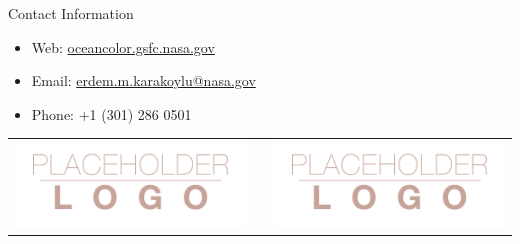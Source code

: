 \documentclass[final]{beamer}
\newlength{\onecolwid}
\begin{document}
\begin{frame}[t]
\begin{columns}[t]
\begin{column}{\onecolwid}
\begin{alertblock}{Contact Information}

\begin{itemize}
\item Web: \href{oceancolor.gsfc.nasa.gov}{oceancolor.gsfc.nasa.gov}
\item Email: \href{mailto:erdem.m.karakoylu@nasa.gov}{erdem.m.karakoylu@nasa.gov}
\item Phone: +1 (301) 286 0501
\end{itemize}

\end{alertblock}

\begin{center}
\begin{tabular}{ccc}
\includegraphics[width=0.4\linewidth]{logo.png} & \hfill & \includegraphics[width=0.4\linewidth]{logo.png}
\end{tabular}
\end{center}


\end{column} %

\end{columns} %

\end{frame} %
\end{document}
